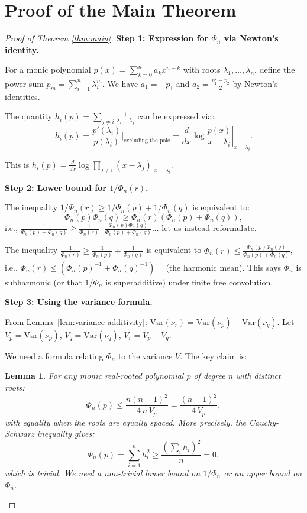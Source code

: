 \documentclass[12pt]{article}
\newtheorem{lemma}{Lemma}
\theoremstyle{definition}
\begin{document}
\section{Proof of the Main Theorem}

\begin{proof}[Proof of Theorem \ref{thm:main}]

\textbf{Step 1: Expression for $\Phi_n$ via Newton's identity.}

For a monic polynomial $p(x) = \sum_{k=0}^n a_k x^{n-k}$ with roots $\lambda_1,\ldots,\lambda_n$, define the power sum $p_m = \sum_{i=1}^n\lambda_i^m$. We have $a_1 = -p_1$ and $a_2 = \frac{p_1^2 - p_2}{2}$ by Newton's identities.

The quantity $h_i(p) = \sum_{j\neq i}\frac{1}{\lambda_i-\lambda_j}$ can be expressed via:
$$h_i(p) = \frac{p'(\lambda_i)}{p(\lambda_i)}\bigg|_{\text{excluding the pole}} = \left.\frac{d}{dx}\log\frac{p(x)}{x-\lambda_i}\right|_{x=\lambda_i}.$$

This is $h_i(p) = \frac{d}{dx}\log\prod_{j\neq i}(x-\lambda_j)\big|_{x=\lambda_i}$.

\textbf{Step 2: Lower bound for $1/\Phi_n(r)$.}

The inequality $1/\Phi_n(r) \geq 1/\Phi_n(p)+1/\Phi_n(q)$ is equivalent to:
$$\Phi_n(p)\Phi_n(q) \geq \Phi_n(r)(\Phi_n(p)+\Phi_n(q)),$$
i.e., $\frac{1}{\Phi_n(p)+\Phi_n(q)} \geq \frac{1}{\Phi_n(r)}\cdot\frac{\Phi_n(p)\Phi_n(q)}{\Phi_n(p)+\Phi_n(q)}$... let us instead reformulate.

The inequality $\frac{1}{\Phi_n(r)} \geq \frac{1}{\Phi_n(p)}+\frac{1}{\Phi_n(q)}$ is equivalent to $\Phi_n(r) \leq \frac{\Phi_n(p)\Phi_n(q)}{\Phi_n(p)+\Phi_n(q)}$, i.e., $\Phi_n(r) \leq (\Phi_n(p)^{-1}+\Phi_n(q)^{-1})^{-1}$ (the harmonic mean). This says $\Phi_n$ is subharmonic (or that $1/\Phi_n$ is superadditive) under finite free convolution.

\textbf{Step 3: Using the variance formula.}

From Lemma~\ref{lem:variance-additivity}: $\mathrm{Var}(\nu_r) = \mathrm{Var}(\nu_p)+\mathrm{Var}(\nu_q)$. Let $V_p = \mathrm{Var}(\nu_p)$, $V_q = \mathrm{Var}(\nu_q)$, $V_r = V_p+V_q$.

We need a formula relating $\Phi_n$ to the variance $V$. The key claim is:

\begin{lemma}\label{lem:phi-bound}
For any monic real-rooted polynomial $p$ of degree $n$ with distinct roots:
$$\Phi_n(p) \leq \frac{n(n-1)^2}{4\,n\,V_p} = \frac{(n-1)^2}{4\,V_p},$$
with equality when the roots are equally spaced. More precisely, the Cauchy-Schwarz inequality gives:
$$\Phi_n(p) = \sum_{i=1}^n h_i^2 \geq \frac{(\sum_i h_i)^2}{n} = 0,$$
which is trivial. We need a non-trivial lower bound on $1/\Phi_n$ or an upper bound on $\Phi_n$.
\end{lemma}


\end{proof}
\end{document}
